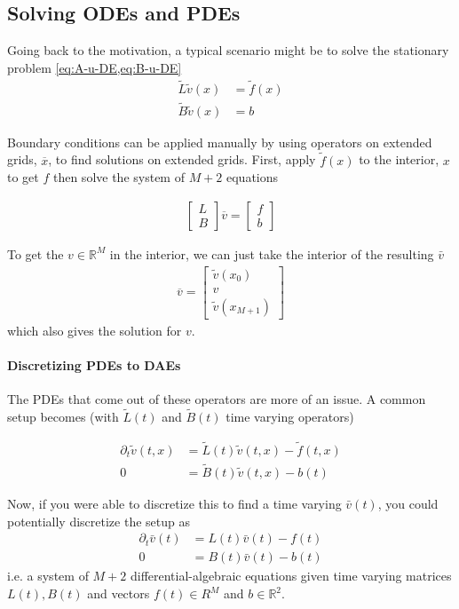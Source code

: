 \documentclass[11pt]{article}
\newcommand{\R}{\ensuremath{\mathbb{R}}}
\newcommand{\D}[1][]{\ensuremath{\partial_{#1}}}
\theoremstyle{definition}
\begin{document}
\subsection{Solving ODEs and PDEs}
Going back to the motivation, a typical scenario might be to solve the stationary problem \cref{eq:A-u-DE,eq:B-u-DE}
\begin{align}
	\tilde{L} \tilde{v}(x) &= \tilde{f}(x)\\
	\tilde{B} \tilde{v}(x) &= b
\end{align}

Boundary conditions can be applied manually by using operators on extended grids, $\overline{x}$, to find solutions on extended grids.  First, apply $\tilde{f}(x)$ to the interior, $x$ to get  $f$ then solve the system of $M+2$ equations

\begin{align}
\begin{bmatrix}
L \\
B
\end{bmatrix}
\overline{v} =
\begin{bmatrix}
f \\
b
\end{bmatrix}\label{eq:reflecting-barrier-extended-system}
\end{align}

To get the $v\in \R^M$ in the interior, we can just take the interior of the resulting $\bar{v}$
\begin{align}
	\overline{v} = \begin{bmatrix}
	\tilde{v}(x_0) \\
	v \\
	\tilde{v}(x_{M+1})
	\end{bmatrix}
\end{align}
which also gives the solution for $v$.

\paragraph{Discretizing PDEs to DAEs}
The PDEs that come out of these operators are more of an issue.  A common setup becomes (with $\tilde{L}(t)$ and $\tilde{B}(t)$ time varying operators)

\begin{align}
	\D[t] \tilde{v}(t,x) &= \tilde{L}(t) \tilde{v}(t,x) - \tilde{f}(t,x)  \\
	0 &= \tilde{B}(t) \tilde{v}(t,x) - b(t)
\end{align}

Now, if you were able to discretize this to find a time varying $\bar{v}(t)$, you could potentially discretize the setup as
\begin{align}
	\D[t] \bar{v}(t) &= L(t) \bar{v}(t) - f(t)\\
	0 &= B(t) \bar{v}(t) - b(t)
\end{align}
i.e. a system of $M+2$ differential-algebraic equations given time varying matrices $L(t), B(t)$ and vectors $f(t) \in R^M$ and $b \in \R^2$.
\end{document}

